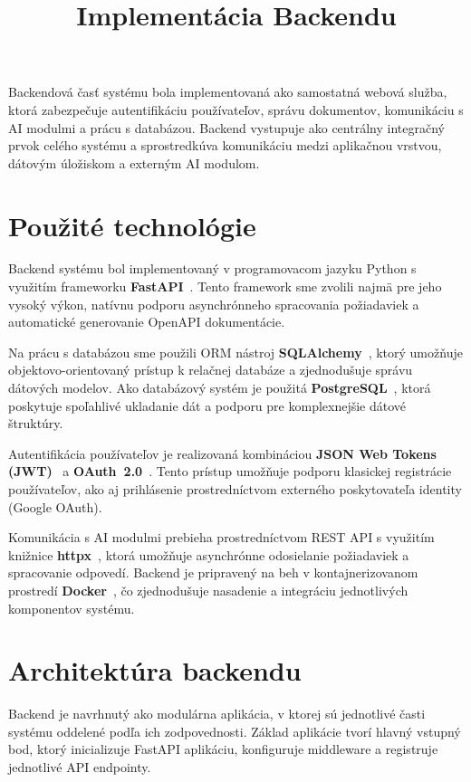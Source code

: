 \documentclass[12pt,a4paper]{article}
\title{Implementácia Backendu}
\author{}
\date{}
\begin{document}
\maketitle
Backendová časť systému bola implementovaná ako samostatná webová služba,
ktorá zabezpečuje autentifikáciu používateľov, správu dokumentov, komunikáciu
s AI modulmi a prácu s databázou. Backend vystupuje ako centrálny integračný
prvok celého systému a sprostredkúva komunikáciu medzi aplikačnou vrstvou,
dátovým úložiskom a externým AI modulom.

\section{Použité technológie}

Backend systému bol implementovaný v programovacom jazyku Python s využitím
frameworku \textbf{FastAPI}~\cite{fastapi}. Tento framework sme zvolili najmä
pre jeho vysoký výkon, natívnu podporu asynchrónneho spracovania požiadaviek a
automatické generovanie OpenAPI dokumentácie.

Na prácu s databázou sme použili ORM nástroj \textbf{SQLAlchemy}~\cite{sqlalchemy},
ktorý umožňuje objektovo-orientovaný prístup k relačnej databáze a zjednodušuje
správu dátových modelov. Ako databázový systém je použitá
\textbf{PostgreSQL}~\cite{postgresql}, ktorá poskytuje spoľahlivé ukladanie dát
a podporu pre komplexnejšie dátové štruktúry.

Autentifikácia používateľov je realizovaná kombináciou
\textbf{JSON Web Tokens (JWT)}~\cite{jwt} a \textbf{OAuth~2.0}~\cite{oauth2}.
Tento prístup umožňuje podporu klasickej registrácie používateľov, ako aj
prihlásenie prostredníctvom externého poskytovateľa identity
(Google OAuth).

Komunikácia s AI modulmi prebieha prostredníctvom REST API s využitím knižnice
\textbf{httpx}~\cite{httpx}, ktorá umožňuje asynchrónne odosielanie požiadaviek
a spracovanie odpovedí. Backend je pripravený na beh v kontajnerizovanom
prostredí \textbf{Docker}~\cite{docker}, čo zjednodušuje nasadenie a integráciu
jednotlivých komponentov systému.

\section{Architektúra backendu}

Backend je navrhnutý ako modulárna aplikácia, v ktorej sú jednotlivé časti
systému oddelené podľa ich zodpovednosti. Základ aplikácie tvorí hlavný
vstupný bod, ktorý inicializuje FastAPI aplikáciu, konfiguruje middleware
a registruje jednotlivé API endpointy.
\end{document}
